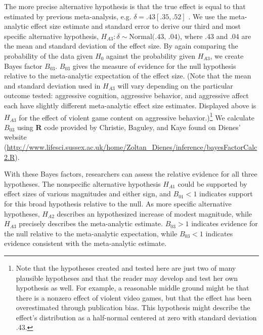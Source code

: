 \documentclass[man]{apa6}
\begin{document}
The more precise alternative hypothesis is that the true effect is equal to that estimated by previous meta-analysis, e.g. $\delta = .43 [.35, .52]$ \citep{Anderson:etal:2010}.  We use the meta-analytic effect size estimate and standard error to derive our third and most specific alternative hypothesis, $H_{A3}: \delta \sim{} \mbox{Normal(.43, .04)}$, where .43 and .04 are the mean and standard deviation of the effect size. 
By again comparing the probability of the data given $H_0$ against the probability given $H_{A3}$, we create Bayes factor $B_{03}$. $B_{03}$ gives the measure of evidence for the null hypothesis relative to the meta-analytic expectation of the effect size. (Note that the mean and standard deviation used in $H_{A3}$ will vary depending on the particular outcome tested: aggressive cognition, aggressive behavior, and aggressive affect each have slightly different meta-analytic effect size estimates. Displayed above is $H_{A3}$ for the effect of violent game content on aggressive behavior.)\footnote{Note that the hypotheses created and tested here are just two of many plausible hypotheses and that the reader may develop and test her own hypothesis as well. For example, a reasonable middle ground might be that there is a nonzero effect of violent video games, but that the effect has been overestimated through publication bias. This hypothesis might describe the effect's distribution as a half-normal centered at zero with standard deviation .43.} 
We calculate $B_{03}$ using {\bf R} code provided by Christie, Baguley, and Kaye found on Dienes' website (\url{http://www.lifesci.sussex.ac.uk/home/Zoltan_Dienes/inference/bayesFactorCalc2.R}).  %

With these Bayes factors, researchers can assess the relative evidence for all three hypotheses. The nonspecific alternative hypothesis $H_{A1}$ could be supported by effect sizes of various magnitudes and either sign, and $B_{01} < 1$ indicates support for this broad hypothesis relative to the null. As more specific alternative hypotheses, $H_{A2}$ describes an hypothesized increase of modest magnitude, while $H_{A3}$ precisely describes the meta-analytic estimate. $B_{03} > 1$ indicates evidence for the null relative to the meta-analytic expectation, while $B_{03} < 1$ indicates evidence consistent with the meta-analytic estimate. 
\end{document}
